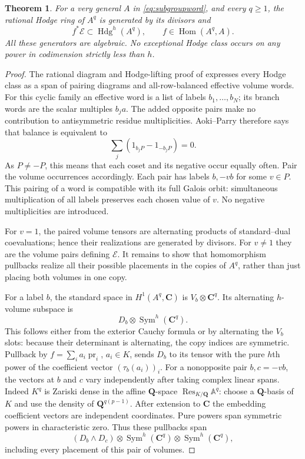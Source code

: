 \documentclass[11pt]{article}
\newtheorem{theorem}{Theorem}[section]
\theoremstyle{definition}
\newcommand{\Q}{\mathbf Q}
\newcommand{\C}{\mathbf C}
\newcommand{\Hdg}{\operatorname{Hdg}}
\newcommand{\Hom}{\operatorname{Hom}}
\newcommand{\Sym}{\operatorname{Sym}}
\begin{document}
\begin{theorem}\label{thm:ring}
For a very general $A$ in \eqref{eq:subgroupword}, and every $q\ge1$,
the rational Hodge ring of $A^q$ is generated by its divisors and
\[
       f^*\mathscr E\subset\Hdg^h(A^q),\qquad
                       f\in\Hom(A^q,A).
\]
All these generators are algebraic. No exceptional Hodge class occurs
on any power in codimension strictly less than $h$.
\end{theorem}
\begin{proof}
The rational diagram and Hodge-lifting proof of
\cite[Sections 5--6]{General} expresses every Hodge class as a span of
pairing diagrams and all-row-balanced effective volume words. For this
cyclic family an effective word is a list of labels $b_1,\ldots,b_N$;
its branch words are the scalar multiples $b_j a$. The added opposite
pairs make no contribution to antisymmetric residue multiplicities.
Aoki--Parry therefore says that balance is equivalent to
\[
     \sum_j (1_{b_jP}-1_{-b_jP})=0.
\]
As $P\ne-P$, this means that each coset and its negative occur equally
often. Pair the volume occurrences accordingly. Each pair has labels
$b,-vb$ for some $v\in P$. This pairing of a word is compatible with
its full Galois orbit: simultaneous multiplication of all labels preserves
each chosen value of $v$. No negative multiplicities are introduced.

For $v=1$, the paired volume tensors are alternating products of
standard--dual coevaluations; hence their realizations are generated by
divisors. For $v\ne1$ they are the volume pairs defining $\mathscr E$.
It remains to show that homomorphism pullbacks realize all their possible
placements in the copies of $A^q$, rather than just placing both volumes
in one copy.

For a label $b$, the standard space in $H^1(A^q,\C)$ is
$V_b\otimes\C^q$. Its alternating $h$-volume subspace is
\[
                  D_b\otimes\Sym^h(\C^q).
\]
This follows either from the exterior Cauchy formula or by alternating
the $V_b$ slots: because their determinant is alternating, the copy
indices are symmetric. Pullback by
$f=\sum_i a_i\operatorname{pr}_i$, $a_i\in K$, sends $D_b$ to its
tensor with the pure $h$th power of the coefficient vector
$(\tau_b(a_i))_i$. For a nonopposite pair $b,c=-vb$, the vectors at
$b$ and $c$ vary independently after taking complex linear spans.
Indeed $K^q$ is Zariski dense in the affine $\Q$-space
$\operatorname{Res}_{K/\Q}\mathbb A^q$: choose a $\Q$-basis of $K$
and use the density of $\Q^{q(p-1)}$. After extension to $\C$ the
embedding coefficient vectors are independent coordinates. Pure powers
span symmetric powers in characteristic zero. Thus these pullbacks span
\[
 (D_b\wedge D_c)\otimes
                  \Sym^h(\C^q)\otimes\Sym^h(\C^q),
\]
including every placement of this pair of volumes.


\end{proof}
\end{document}
